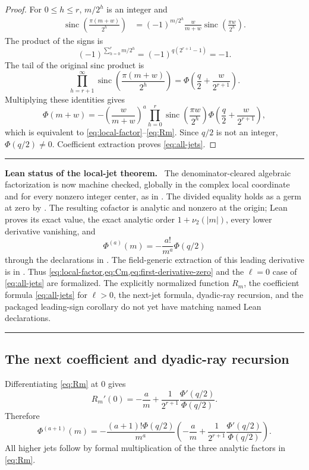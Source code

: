 \documentclass[11pt,oneside]{article}
\numberwithin{equation}{section}
\theoremstyle{plain}
\theoremstyle{definition}
\theoremstyle{remark}
\newcommand{\sinc}{\operatorname{sinc}}
\newenvironment{statusbox}[1]{%
  \par\medskip\noindent\begin{minipage}{\textwidth}%
  \color{DeepBlue}\hrule\vspace{5pt}%
  \color{black}\textbf{\color{DeepBlue}#1.}\ }{%
  \par\vspace{5pt}\color{DeepBlue}\hrule
  \end{minipage}\par\medskip}
\begin{document}
\begin{proof}
For $0\le h\le r$, $m/2^h$ is an integer and
\begin{align*}
 \sinc\!\left(\frac{\pi(m+w)}{2^h}\right)
 &=(-1)^{m/2^h}\frac{w}{m+w}
   \sinc\!\left(\frac{\pi w}{2^h}\right).
\end{align*}
The product of the signs is
\[
 (-1)^{\sum_{h=0}^{r}m/2^h}
 =(-1)^{q(2^{r+1}-1)}=-1.
\]
The tail of the original sinc product is
\[
 \prod_{h=r+1}^{\infty}
 \sinc\!\left(\frac{\pi(m+w)}{2^h}\right)
 =\Phi\!\left(\frac q2+\frac{w}{2^{r+1}}\right).
\]
Multiplying these identities gives
\[
 \Phi(m+w)=-\left(\frac{w}{m+w}\right)^a
 \prod_{h=0}^{r}\sinc\!\left(\frac{\pi w}{2^h}\right)
 \Phi\!\left(\frac q2+\frac{w}{2^{r+1}}\right),
\]
which is equivalent to \cref{eq:local-factor}--\cref{eq:Rm}.  Since $q/2$ is not an integer, $\Phi(q/2)\ne0$.  Coefficient extraction proves \cref{eq:all-jets}.
\end{proof}

\begin{statusbox}{Lean status of the local-jet theorem}
The denominator-cleared algebraic factorization is now machine checked,
globally in the complex local coordinate and for every nonzero integer
center, as
 in
.  The divided equality holds as a
germ at zero by
.
The resulting cofactor is analytic and nonzero at the origin; Lean proves
its exact value, the exact analytic order \(1+\nu_2(|m|)\), every lower
derivative vanishing, and
\[
 \Phi^{(a)}(m)=-\frac{a!}{m^a}\Phi(q/2)
\]
through the declarations in .  The
field-generic extraction of this leading derivative is in
.  Thus
\cref{eq:local-factor,eq:Cm,eq:first-derivative-zero} and the
\(\ell=0\) case of \cref{eq:all-jets} are formalized.  The explicitly
normalized function \(R_m\), the coefficient formula
\cref{eq:all-jets} for \(\ell>0\), the next-jet formula, dyadic-ray
recursion, and the packaged leading-sign corollary do not yet have matching
named Lean declarations.
\end{statusbox}

\subsection{The next coefficient and dyadic-ray recursion}

Differentiating \cref{eq:Rm} at $0$ gives
\begin{equation}\label{eq:Rprime}
 R_m'(0)=-\frac{a}{m}
 +\frac1{2^{r+1}}\frac{\Phi'(q/2)}{\Phi(q/2)}.
\end{equation}
Therefore
\begin{equation}\label{eq:next-jet}
 \Phi^{(a+1)}(m)
 =-\frac{(a+1)!\Phi(q/2)}{m^a}
 \left(-\frac{a}{m}
 +\frac1{2^{r+1}}\frac{\Phi'(q/2)}{\Phi(q/2)}\right).
\end{equation}
All higher jets follow by formal multiplication of the three analytic factors in \cref{eq:Rm}.
\end{document}
